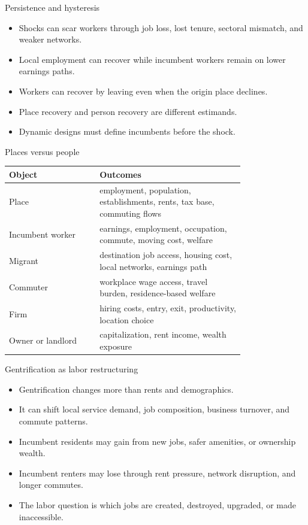 \documentclass[aspectratio=169,11pt]{beamer}
\begin{document}
\begin{frame}{Persistence and hysteresis}
\begin{itemize}
    \item Shocks can scar workers through job loss, lost tenure, sectoral mismatch, and weaker networks.
    \item Local employment can recover while incumbent workers remain on lower earnings paths.
    \item Workers can recover by leaving even when the origin place declines.
    \item Place recovery and person recovery are different estimands.
    \item Dynamic designs must define incumbents before the shock.
\end{itemize}
\end{frame}

\begin{frame}{Places versus people}
\small
\begin{tabular}{p{0.30\linewidth} p{0.48\linewidth}}
\toprule
Object & Outcomes \\
\midrule
Place & employment, population, establishments, rents, tax base, commuting flows \\
Incumbent worker & earnings, employment, occupation, commute, moving cost, welfare \\
Migrant & destination job access, housing cost, local networks, earnings path \\
Commuter & workplace wage access, travel burden, residence-based welfare \\
Firm & hiring costs, entry, exit, productivity, location choice \\
Owner or landlord & capitalization, rent income, wealth exposure \\
\bottomrule
\end{tabular}
\end{frame}

\begin{frame}{Gentrification as labor restructuring}
\begin{itemize}
    \item Gentrification changes more than rents and demographics.
    \item It can shift local service demand, job composition, business turnover, and commute patterns.
    \item Incumbent residents may gain from new jobs, safer amenities, or ownership wealth.
    \item Incumbent renters may lose through rent pressure, network disruption, and longer commutes.
    \item The labor question is which jobs are created, destroyed, upgraded, or made inaccessible.
\end{itemize}
\end{frame}
\end{document}
